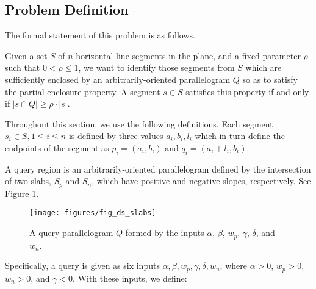\subsection{Problem Definition}
\label{:slabs:two:problem}

The formal statement of this problem is as follows.

\begin{problem}
Given a set $S$ of $n$ horizontal line segments in the plane, and a fixed parameter $\rho$ such that $0 < \rho \leq 1$, we want to identify those segments from $S$ which are sufficiently enclosed by an arbitrarily-oriented parallelogram $Q$ so as to satisfy the partial enclosure property.
A segment $s \in S$ satisfies this property if and only if $|s \cap Q| \geq \rho \cdot |s|$.
\end{problem}

Throughout this section, we use the following definitions. Each segment $s_i \in S, 1 \leq i \leq n$ is defined by three values $a_i, b_i, l_i$ which in turn define the endpoints of the segment as $p_i = (a_i, b_i)$ and $q_i = (a_i + l_i, b_i)$.

A query region is an arbitrarily-oriented parallelogram defined by the intersection of two slabs, $S_p$ and $S_n$, which have positive and negative slopes, respectively. See Figure \ref{fig:slabs:two:ds}.

\begin{figure}[t]
\begin{center}
  \texttt{[image: figures/fig\_ds\_slabs]}
  \caption{A query parallelogram $Q$ formed by the inputs $\alpha$, $\beta$, $w_p$,
  $\gamma$, $\delta$, and $w_n$.}
  \label{fig:slabs:two:ds}
\end{center}
\end{figure}

Specifically, a query is given as six inputs $\alpha, \beta, w_p, \gamma, \delta, w_n$, where $\alpha > 0$, $w_p > 0$, $w_n > 0$, and $\gamma < 0$. With these inputs, we define:

